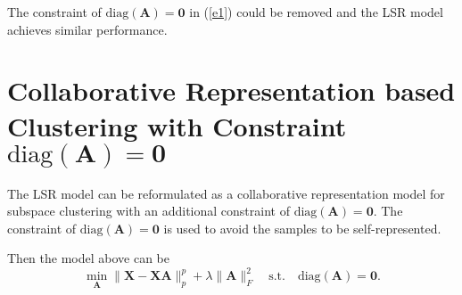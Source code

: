 \documentclass[10pt,twocolumn,letterpaper]{article}
\begin{document}
The constraint of  $\text{diag}(\bm{A})=\bm{0}$ in (\ref{e1}) could be removed and the LSR model achieves similar performance.


\section{Collaborative Representation based Clustering with Constraint $\text{diag}(\bm{A})=\bm{0}$}
The LSR model can be reformulated as a collaborative representation model \cite{crc} for subspace clustering with an additional constraint of $\text{diag}(\bm{A})=\bm{0}$. The constraint of $\text{diag}(\bm{A})=\bm{0}$ is used to avoid the samples to be self-represented.

Then the model above can be 
\begin{equation}
\label{e2}
\min_{\bm{A}}
\|
\bm{X}
-
\bm{X}\bm{A}
\|_{p}^{p}
+
\lambda
\|
\bm{A}
\|_{F}^{2}
\quad
\text{s.t.}
\quad
\text{diag}(\bm{A})=\bm{0}.
\end{equation}
\end{document}
